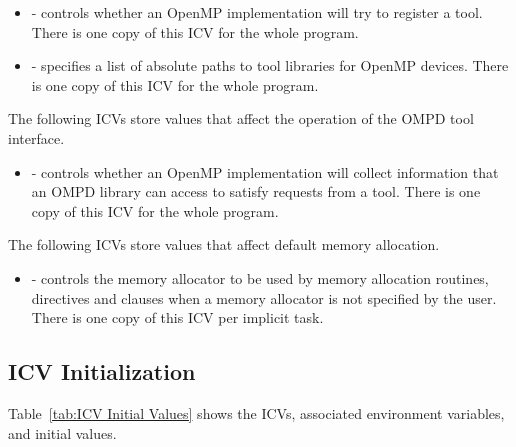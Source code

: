 \begin{itemize}
\item {} - controls whether an OpenMP implementation will try to register 
      a tool. There is one copy of this ICV for the whole program.
\item {} - specifies a list of absolute paths to tool libraries 
      for OpenMP devices. There is one copy of this ICV for the whole program.
\end{itemize}

The following ICVs store values that affect the operation of the OMPD tool interface.

\begin{itemize}
\item {} - controls whether an OpenMP implementation will collect
      information that an OMPD library can access to satisfy requests from
      a tool. There is one copy of this ICV for the whole program.
\end{itemize}

The following ICVs store values that affect default memory allocation.

\begin{itemize}
\item {} - controls the memory allocator to be used by 
      memory allocation routines, directives and clauses when a memory allocator 
      is not specified by the user. There is one copy of this ICV per implicit task.
\end{itemize}



\subsection{ICV Initialization}
\label{subsec:ICV Initialization}
Table~\ref{tab:ICV Initial Values} shows the ICVs, associated
environment variables, and initial values.

